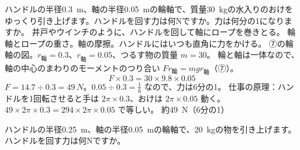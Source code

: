 \begin{phreidai}[井戸の輪軸]
\label{ph:力-5:ex9}ハンドルの半径\qty{0.3}{m}、軸の半径\qty{0.05}{m}の輪軸で、質量\qty{30}{kg}の水入りのおけをゆっくり引き上げます。ハンドルを回す力は何Nですか。力は何分の1になりますか。
\phbamen
井戸やウインチのように、ハンドルを回して軸にロープを巻きとる。
\phmushi
輪軸とロープの重さ。軸の摩擦。ハンドルにはいつも直角に力をかける。
\phzu
⑦の輪軸の図。$r_{\text{輪}}=0.3$、$r_{\text{軸}}=0.05$、つるす物の質量 $m=30$。
\phriyu
輪と軸は一体なので、軸の中心のまわりのモーメントのつり合い $Fr_{\text{輪}}=mgr_{\text{軸}}$（⑦）。
\phtateru
\[ F\times0.3=30\times9.8\times0.05 \]
\phtoku
$F=14.7\div 0.3=\qty{49}{N}$。$0.05\div 0.3=\tfrac{1}{6}$ なので、力は6分の1。
\phtashikame
仕事の原理：ハンドルを1回転させると手は $2\pi\times0.3$、おけは $2\pi\times0.05$ 動く。$49\times2\pi\times0.3=294\times2\pi\times0.05$ で等しい。
\kotae 約\qty{49}{N}（6分の1）
\end{phreidai}
\begin{jibun}
ハンドルの半径\qty{0.25}{m}、軸の半径\qty{0.05}{m}の輪軸で、\qty{20}{kg}の物を引き上げます。ハンドルを回す力は何Nですか。
\end{jibun}

